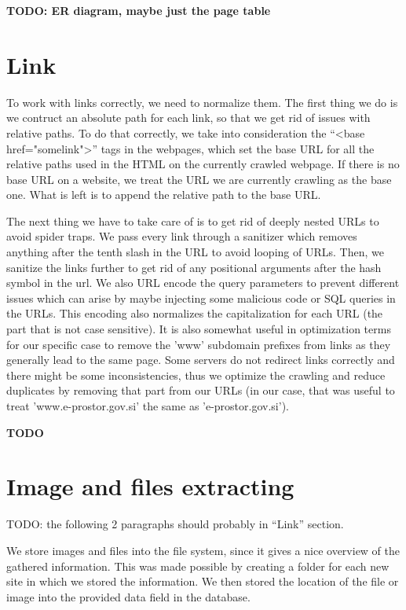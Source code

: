 \documentclass[9pt]{IEEEtran}
\begin{document}
\textbf{TODO: ER diagram, maybe just the page table}

\section{Link}

To work with links correctly, we need to normalize them.
The first thing we do is we contruct an absolute path for each link, so that we get rid of issues with relative paths.
To do that correctly, we take into consideration the ``<base href="somelink">'' tags in the webpages, which set the base URL for all the relative paths used in the HTML on the currently crawled webpage.
If there is no base URL on a website, we treat the URL we are currently crawling as the base one.
What is left is to append the relative path to the base URL.

The next thing we have to take care of is to get rid of deeply nested URLs to avoid spider traps.
We pass every link through a sanitizer which removes anything after the tenth slash in the URL to avoid looping of URLs.
Then, we sanitize the links further to get rid of any positional arguments after the hash symbol in the url.
We also URL encode the query parameters to prevent different issues which can arise by maybe injecting some malicious code or SQL queries in the URLs.
This encoding also normalizes the capitalization for each URL (the part that is not case sensitive). It is also somewhat useful in optimization terms for our specific case to remove the 'www' subdomain prefixes from links as they generally lead to the same page. Some servers do not redirect links correctly and there might be some inconsistencies, thus we optimize the crawling and reduce duplicates by removing that part from our URLs (in our case, that was useful to treat 'www.e-prostor.gov.si' the same as 'e-prostor.gov.si').


\textbf{TODO}

\section{Image and files extracting}

TODO: the following 2 paragraphs should probably in ``Link'' section.

We store images and files into the file system, since it gives a nice overview of the gathered information. 
This was made possible by creating a folder for each new site in which we stored the information. 
We then stored the location of the file or image into the provided data field in the database.
\end{document}
